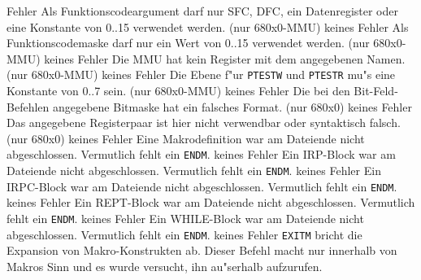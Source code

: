 \documentclass[12pt,a4paper,twoside]{report}
\newcommand{\tty}[1]{{\tt #1}}
\begin{document}
\begin{description}
               {Fehler}
               {Als Funktionscodeargument darf nur SFC, DFC, ein
                Datenregister oder eine Konstante von 0..15 verwendet
                werden. (nur 680x0-MMU)}
               {keines}
               {Fehler}
               {Als Funktionscodemaske darf nur ein Wert von
                0..15 verwendet werden. (nur 680x0-MMU)}
               {keines}
               {Fehler}
               {Die MMU hat kein Register mit dem angegebenen
                Namen. (nur 680x0-MMU)}
               {keines}
               {Fehler}
               {Die Ebene f"ur \tty{PTESTW} und \tty{PTESTR} mu"s eine
                Konstante von 0..7 sein. (nur 680x0-MMU)}
               {keines}
               {Fehler}
               {Die bei den Bit-Feld-Befehlen angegebene
                Bitmaske hat ein falsches Format. (nur 680x0)}
               {keines}
               {Fehler}
               {Das angegebene Registerpaar ist hier nicht
                verwendbar oder syntaktisch falsch. (nur 680x0)}
               {keines}
               {Fehler}
               {Eine Makrodefinition war am Dateiende nicht
                abgeschlossen.  Vermutlich fehlt ein \tty{ENDM}.}
               {keines}
               {Fehler}
               {Ein IRP-Block war am Dateiende nicht
                abgeschlossen.  Vermutlich fehlt ein \tty{ENDM}.}
               {keines}
               {Fehler}
               {Ein IRPC-Block war am Dateiende nicht
                abgeschlossen.  Vermutlich fehlt ein \tty{ENDM}.}
               {keines}
               {Fehler}
               {Ein REPT-Block war am Dateiende nicht
                abgeschlossen.  Vermutlich fehlt ein \tty{ENDM}.}
               {keines}
               {Fehler}
               {Ein WHILE-Block war am Dateiende nicht
                abgeschlossen.  Vermutlich fehlt ein \tty{ENDM}.}
               {keines}
               {Fehler}
               {\tty{EXITM} bricht die Expansion von
                Makro-Konstrukten ab.  Dieser Befehl macht nur innerhalb
                von Makros Sinn und es wurde versucht, ihn au"serhalb
                aufzurufen.}

\end{description}
\end{document}
